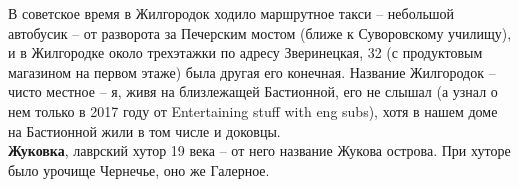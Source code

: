 В советское время в Жилгородок ходило ма\-ршрутное такси – небольшой автобусик – от разворота за Печерским мостом (ближе к Суворовскому училищу), и в Жилгородке около трехэтажки по адресу Зверинецкая, 32 (с продуктовым магазином на первом этаже) была другая его конечная. Название Жилгородок – чисто местное – я, живя на близлежащей Бастионной, его не слышал (а узнал о нем только в 2017 году от Entertaining stuff with eng subs), хотя в нашем доме на Бастионной жили в том числе и доковцы.\\

\textbf{Жуковка}, лаврский хутор 19 века – от него название Жукова острова. При хуторе было урочище Чернечье, оно же Галерное.\\
